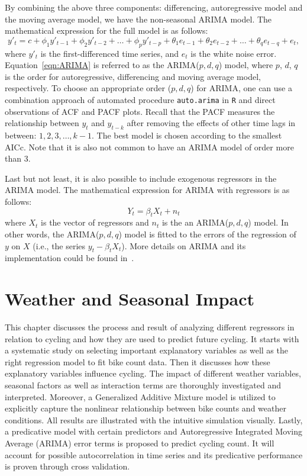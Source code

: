 \documentclass [11pt, proquest] {uwthesis}[2015/03/03]
\begin{document}
By combining the above three components: differencing, autoregressive model and the moving average model, we have the non-seasonal ARIMA model. The mathematical expression for the full model is as follows:
\begin{equation}
y'_t = c + \phi_1 y'_{t-1} + \phi_2 y'_{t-2} + \hdots + \phi_p y'_{t-p} + \theta_1 e_{t-1} + \theta_2 e_{t-2} + \hdots + \theta_q e_{t-q} + e_t, \label{eqn:ARIMA}
\end{equation}
where $y'_t$ is the first-differenced time series, and $e_t$ is the white noise error. Equation~\eqref{eqn:ARIMA} is referred to as the ARIMA($p,d,q$) model, where $p$, $d$, $q$ is the order for autoregressive, differencing and moving average model, respectively. To choose an appropriate order ($p,d,q$) for ARIMA, one can use a combination approach of automated procedure \texttt{auto.arima} in \texttt{R} and direct observations of ACF and PACF plots. Recall that the PACF measures the relationship between $y_t$ and $y_{t-k}$ after removing the effects of other time lags in between: $1, 2, 3, \hdots, k-1$. The best model is chosen according to the smallest AICc. Note that it is also not common to have an ARIMA model of order more than 3.

Last but not least, it is also possible to include exogenous regressors in the ARIMA model. The mathematical expression for ARIMA with regressors is as follows:
\[Y_t = \beta_t X_t + n_t\]
where $X_t$ is the vector of regressors and $n_t$ is the an ARIMA($p,d,q$) model. In other words, the ARIMA($p,d,q$) model is fitted to the errors of the regression of $y$ on $X$ (i.e., the series $y_t - \beta_t X_t$). More details on ARIMA and its implementation could be found in~\cite{Hall11}.


 
\chapter{Weather and Seasonal Impact}

This chapter discusses the process and result of analyzing different regressors in relation to cycling and how they are used to predict future cycling. It starts with a systematic study on selecting important explanatory variables as well as the right regression model to fit bike count data. Then it discusses how these explanatory variables influence cycling. The impact of different weather variables, seasonal factors as well as interaction terms are thoroughly investigated and interpreted. Moreover, a Generalized  Additive Mixture model is utilized to explicitly capture the nonlinear relationship between bike counts and weather conditions. All results are illustrated with the intuitive simulation visually. Lastly, a predicative model with certain predictors and Autoregressive Integrated Moving Average (ARIMA) error terms is proposed to predict cycling count. It will account for possible autocorrelation in time series and its predicative performance is proven through cross validation.
\end{document}
